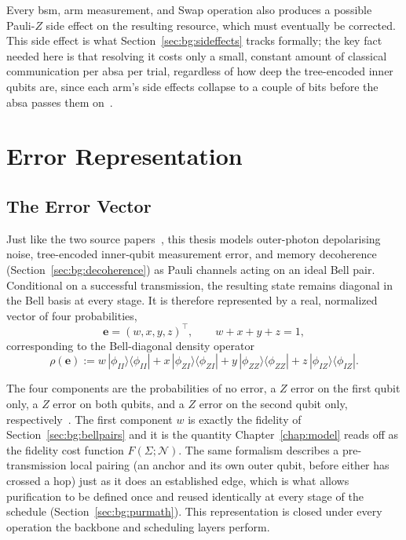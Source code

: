 Every \Gls{bsm}, arm measurement, and Swap operation also produces a possible Pauli-$Z$ side effect on the resulting resource, which must eventually be corrected. This side effect is what Section~\ref{sec:bg:sideffects} tracks formally; the key fact needed here is that resolving it costs only a small, constant amount of classical communication per \Gls{absa} per trial, regardless of how deep the tree-encoded inner qubits are, since each arm's side effects collapse to a couple of bits before the \Gls{absa} passes them on~\cite{Benchasattabuse2026Bridging}.

\section{Error Representation}
\label{sec:bg:errors}

\subsection{The Error Vector}
\label{sec:bg:errorvec}

Just like the two source papers~\cite{Benchasattabuse2026Bridging,Benchasattabuse2025Integrating}, this thesis models outer-photon depolarising noise, tree-encoded inner-qubit measurement error, and memory decoherence (Section~\ref{sec:bg:decoherence}) as Pauli channels acting on an ideal Bell pair. Conditional on a successful transmission, the resulting state remains diagonal in the Bell basis at every stage. It is therefore represented by a real, normalized vector of four probabilities,
\begin{equation}
    \mathbf{e} = (w, x, y, z)^\top,
    \qquad w+x+y+z=1,
    \label{eq:errorvec}
\end{equation}
corresponding to the Bell-diagonal density operator
\begin{equation}
    \rho(\mathbf{e}) := w\,|\phi_{II}\rangle\!\langle\phi_{II}|
        + x\,|\phi_{ZI}\rangle\!\langle\phi_{ZI}|
        + y\,|\phi_{ZZ}\rangle\!\langle\phi_{ZZ}|
        + z\,|\phi_{IZ}\rangle\!\langle\phi_{IZ}|.
    \label{eq:bell-diagonal-state}
\end{equation}

The four components are the probabilities of no error, a $Z$ error on the first qubit only, a $Z$ error on both qubits, and a $Z$ error on the second qubit only, respectively~\cite{Benchasattabuse2025Integrating}. The first component $w$ is exactly the fidelity of Section~\ref{sec:bg:bellpairs} and it is the quantity Chapter~\ref{chap:model} reads off as the fidelity cost function $F(\Sigma;\mathcal{N})$. The same formalism describes a pre-transmission local pairing (an anchor and its own outer qubit, before either has crossed a hop) just as it does an established edge, which is what allows purification to be defined once and reused identically at every stage of the schedule (Section~\ref{sec:bg:purmath}). This representation is closed under every operation the backbone and scheduling layers perform.

